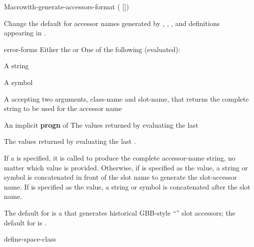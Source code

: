 \documentclass[10pt,twoside,english,pdftex]{article}
\begin{document}
\begin{functiondoc}{Macro}{with-generate-accessors-format}%
  {( [])
    \superstar{}
    \returns{} \superstar{}}

\fnsyntax

\fnpurpose Change the default for accessor names generated by
\textbf{}, \textbf{},
\textbf{}, and
\textbf{} definitions appearing in .

\fnpackage {}

\fnmodule {}

\fnargs
\begin{args}{error-forms}
\arg[format] Either the   or 
 One of the following (evaluated):
\begin{tightitemize}
\item A string 
\item A symbol
\item A  accepting two arguments, class-name and
  slot-name, that returns the complete string to be used for the accessor name
\end{tightitemize}
\arg[forms] An implicit \textbf{progn} of 
\arg[results] The values returned by evaluating the last 
\end{args}

\fnreturns The values returned by evaluating the last .

\fndescription If a   is
specified, it is called to produce the complete accessor-name string, no
matter which  value is provided.  Otherwise, if 
is specified as the  value, a string or symbol
 is concatenated in front of the slot name to
generate the slot-accessor name.  If  is specified as the
 value, a string or symbol  is
concatenated after the slot name.

The default  for  is a
 that generates historical GBB-style
``'' slot accessors; the default for
 is .

\begin{alsos}{define-space-class}
\end{alsos}


\end{functiondoc}
\end{document}
